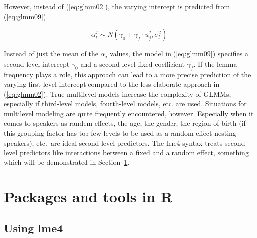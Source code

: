 \documentclass[a4paper,12pt]{article}
\begin{document}
However, instead of (\ref{eq:glmm02}), the varying intercept is predicted from (\ref{eq:glmm09}).

\begin{equation}
  \alpha_l^j\sim N(\gamma_0+\gamma_f\cdot u_j^j,\sigma_l^2)
  \label{eq:glmm09}
\end{equation}

Instead of just the mean of the $\alpha_j$ values, the model in (\ref{eq:glmm09}) specifies a second-level intercept $\gamma_0$ and a second-level fixed coefficient $\gamma_f$.
If the lemma frequency plays a role, this approach can lead to a more precise prediction of the varying first-level intercept compared to the less elaborate approach in (\ref{eq:glmm02}).
True multilevel models increase the complexity of GLMMs, especially if third-level models, fourth-level models, etc. are used.
Situations for multilevel modeling are quite frequently encountered, however.
Especially when it comes to speakers as random effects, the age, the gender, the region of birth (if this grouping factor has too few levels to be used as a random effect nesting speakers), etc.\ are ideal second-level predictors.
The lme4 syntax treats second-level predictors like interactions between a fixed and a random effect, something which will be demonstrated in Section~\ref{sec:estimationofhierarchicalmodelsinr}.

% 


\section{Packages and tools in R}
\label{sec:estimationofhierarchicalmodelsinr}

\subsection{Using lme4}
\label{sec:usinglme4}
\end{document}
